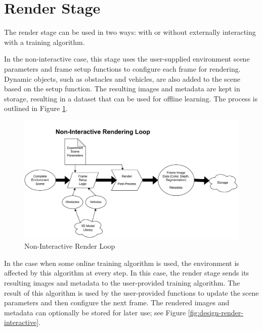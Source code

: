 \section{Render Stage}
\label{sec:render-stage}


The render stage can be used in two ways: with or without externally interacting with a training algorithm.

In the non-interactive case, this stage uses the user-supplied environment scene parameters and frame setup functions to configure each frame for rendering. Dynamic objects, such as obstacles and vehicles, are also added to the scene based on the setup function. The resulting images and metadata are kept in storage, resulting in a dataset that can be used for offline learning. The process is outlined in Figure \ref{fig:design-render-non-interactive}.


\begin{figure}[h]
    \centering
    \includegraphics[width=14.5cm]{src/img/fig/fig-4 non-interactive render loop.drawio.pdf}
    \caption{Non-Interactive Render Loop}
    \label{fig:design-render-non-interactive}

\end{figure}


In the case when some online training algorithm is used, the environment is affected by this algorithm at every step. In this case, the render  stage sends its resulting images and metadata to the user-provided training algorithm. The result of this algorithm is used by the user-provided functions to update the scene parameters and then configure the next frame. The rendered images and metadata can optionally be stored for later use; see Figure \ref{fig:design-render-interactive}.

